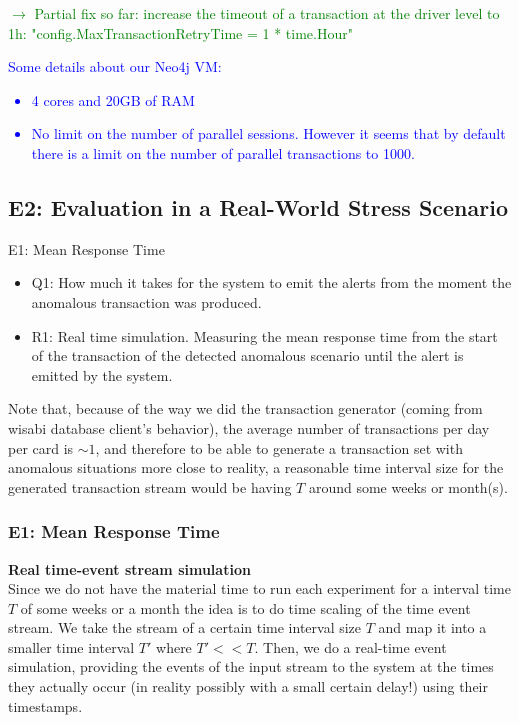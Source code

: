 \documentclass[12pt,a4paper]{article}
\begin{document}
\textcolor{green}{$\rightarrow$ Partial fix so far: increase the timeout of a transaction at the driver level to 1h: "config.MaxTransactionRetryTime = 1 * time.Hour"\\}

\textcolor{blue}{Some details about our Neo4j VM:
\begin{itemize}
    \item 4 cores and 20GB of RAM
    \item No limit on the number of parallel sessions. However it seems that by default there is a limit on the number of parallel transactions to 1000.
\end{itemize}
}

\subsection*{E2: Evaluation in a Real-World Stress Scenario}


E1: Mean Response Time

\begin{itemize}
  \item Q1: How much it takes for the system to emit the alerts from the moment the anomalous transaction was produced.
  \item R1: Real time simulation. Measuring the mean response time from the start of the transaction of the detected anomalous scenario until the alert is emitted by the system.
\end{itemize}


Note that, because of the way we did the transaction generator (coming from wisabi database client's behavior), the average number of transactions per day per card is $\sim1$, and therefore to be able to generate a transaction set with anomalous situations more close to reality, a reasonable time interval size for the generated transaction stream would be having $T$ around some weeks or month(s).

\subsubsection{E1: Mean Response Time}

\textbf{Real time-event stream simulation\\}
Since we do not have the material time to run each experiment for a interval time $T$ of some weeks or a month the idea is to do time scaling of the time event stream. We take the stream of a certain time interval size $T$ and map it into a smaller time interval
$T'$ where $T' << T$. Then, we do a real-time event simulation, providing the events of the input stream to the system at the times they actually occur (in reality possibly with a small certain delay!) using their timestamps.
\end{document}
